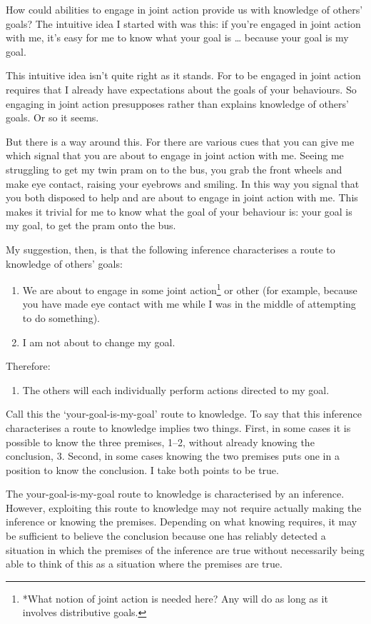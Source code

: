\documentclass[12pt,a4paper]{extarticle}
\begin{document}
How could abilities to engage in joint action provide us with knowledge of others’ goals?   The intuitive idea I started with was this: if you’re engaged in joint action with me, it’s easy for me to know what your goal is … because your goal is my goal.  

This intuitive idea isn’t quite right as it stands.  For to be engaged in joint action requires that I already have expectations about the goals of your behaviours.  
So engaging in joint action presupposes rather than explains knowledge of others’ goals.  Or so it seems.

But there is a way around this.  For there are various cues that you can give me which signal that you are about to engage in joint action with me.  Seeing me struggling to get my twin pram on to the bus, you grab the front wheels and make eye contact, raising your eyebrows and smiling.  In this way you signal that you both disposed to help and are about to engage in joint action with me.  This makes it trivial for me to know what the goal of your behaviour is: your goal is my goal, to get the pram onto the bus.

My suggestion, then, is that the following inference characterises a route to knowledge of others’ goals:
%
\begin{enumerate}
\item We are about to engage in some joint action\footnote{
*What notion of joint action is needed here?  Any will do as long as it involves distributive goals.
}
or other (for example, because you have made eye contact with me while I was in the middle of attempting to do something).

\item I am not about to change my goal.

\end{enumerate}
%
Therefore:
%
\begin{enumerate}[resume]
%
\item The others will each individually perform actions directed to my goal.
\end{enumerate}
%
Call this the ‘your-goal-is-my-goal’ route to knowledge.  To say that this inference characterises a route to knowledge implies two things.  First, in some cases it is possible to know the three premises, 1–2, without already knowing the conclusion, 3.  Second, in some cases knowing the two premises puts one in a position to know the conclusion.  I take both points to be true.

The your-goal-is-my-goal route to knowledge is characterised by an inference.  However, exploiting this route to knowledge may not require actually making the inference or knowing the premises.  Depending on what knowing requires, it may be sufficient to believe the conclusion because one has reliably detected a situation in which the premises of the inference are true without necessarily being able to think of this as a situation where the premises are true.
\end{document}

